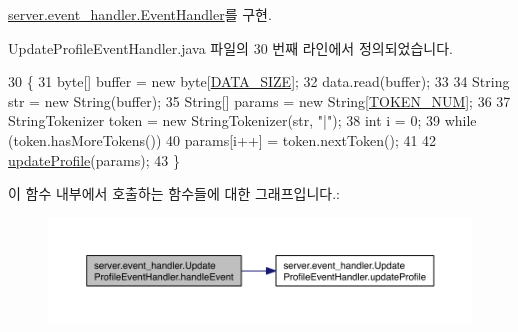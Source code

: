 \hyperlink{interfaceserver_1_1event__handler_1_1_event_handler_a9b103dcdc88adff0e084473ba36fe865}{server.\-event\-\_\-handler.\-Event\-Handler}를 구현.



Update\-Profile\-Event\-Handler.\-java 파일의 30 번째 라인에서 정의되었습니다.


\begin{DoxyCode}
30                                                                  \{
31         byte[] buffer = \textcolor{keyword}{new} byte[\hyperlink{classserver_1_1event__handler_1_1_update_profile_event_handler_ad0241e6294463e85ab84ee1d7910f891}{DATA\_SIZE}];
32         data.read(buffer);
33 
34         String str = \textcolor{keyword}{new} String(buffer);
35         String[] params = \textcolor{keyword}{new} String[\hyperlink{classserver_1_1event__handler_1_1_update_profile_event_handler_a5af91c4209c042d2e7b251cc33dfa465}{TOKEN\_NUM}];
36 
37         StringTokenizer token = \textcolor{keyword}{new} StringTokenizer(str, \textcolor{stringliteral}{"|"});
38         \textcolor{keywordtype}{int} i = 0;
39         \textcolor{keywordflow}{while} (token.hasMoreTokens())
40             params[i++] = token.nextToken();
41 
42         \hyperlink{classserver_1_1event__handler_1_1_update_profile_event_handler_a601bec62fe1c6e7d783de2a824a20fb7}{updateProfile}(params);
43     \}
\end{DoxyCode}


이 함수 내부에서 호출하는 함수들에 대한 그래프입니다.\-:\nopagebreak
\begin{figure}[H]
\begin{center}
\leavevmode
\includegraphics[width=350pt]{classserver_1_1event__handler_1_1_update_profile_event_handler_a48a8c2c909585327d6ea0c5ecc06f6ee_cgraph}
\end{center}
\end{figure}


